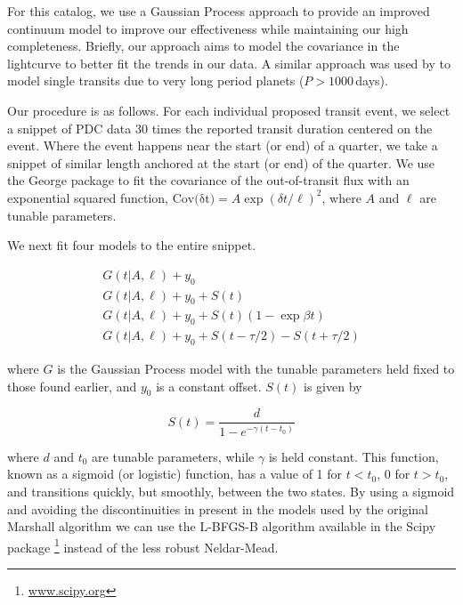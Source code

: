 For this catalog, we use a Gaussian Process approach \citep[GP][]{Rasmussen10} to provide an improved continuum model to improve our effectiveness while maintaining our high completeness. Briefly, our approach aims to model the covariance in the lightcurve to better fit the trends in our data.
A similar approach was used by \citet{ForemanMackey16} to model single transits due to very long period planets ($P > 1000$\,days).

Our procedure is as follows. For each individual proposed transit event, we select a snippet of PDC data 30 times the reported transit duration centered on the event. Where the event happens near the start (or end) of a quarter, we take a snippet of similar length anchored at the start (or end) of the quarter. We use the George package \citep{Ambikasaran14} to fit the covariance of the out-of-transit flux with an exponential squared function, $ {\mathrm{Cov(\delta t})} = A \exp{ (\delta t/\ell)^2}$, where $A$ and $\ell$ are tunable parameters. 

We next fit four models to the entire snippet.

\begin{equation}
\left.\begin{aligned}
G(t | A, \ell) + y_0 \\
G(t | A, \ell) + y_0 + S(t)\\
G(t | A, \ell) + y_0 + S(t)(1 - \exp{\beta t})\\
G(t | A, \ell) + y_0 + S(t - \tau/2) - S(t + \tau/2) 
\end{aligned}\right.
\end{equation}

\noindent
where $G$ is the Gaussian Process model with the tunable parameters held fixed to those found earlier, and $y_0$ is a constant offset. $S(t)$ is given by

\begin{equation}
S(t) = \frac{d}{1 - e^{-\gamma (t-t_0)} }
\end{equation}

\noindent
where $d$ and $t_0$ are tunable parameters, while $\gamma$ is held constant. This function, known as a sigmoid (or logistic) function, has a value of 1 for $t<t_0$, 0 for $t>t_0$, and transitions quickly, but smoothly, between the two states. By using a sigmoid and avoiding the discontinuities in present in the models used by the original Marshall algorithm we can use the L-BFGS-B algorithm \citep{Byrd95} available in the Scipy package \footnote{\url{www.scipy.org}} instead of the less robust Neldar-Mead.

